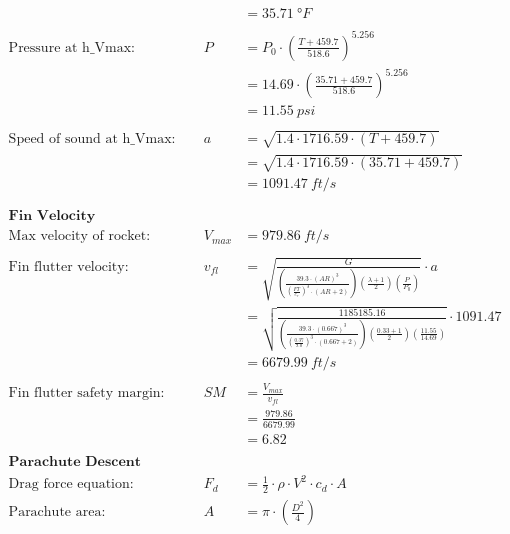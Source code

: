 \documentclass{article}
\begin{document}
\begin{align*}
		&& &= \SI{35.71}{\degree F} \\ \\
		\text{Pressure at h\_Vmax:}& &P &= P_{0} \cdot \left(\frac{T + 459.7}{ 518.6 }\right)^{5.256} \tag{eqn.6} \\
		&& &= 14.69\cdot \left(\frac{35.71 + 459.7 }{ 518.6 }\right)^{5.256} \\
		&& &= \SI{11.55}{psi} \\ \\
		\text{Speed of sound at h\_Vmax: }& &a &= \sqrt { 1.4 \cdot 1716.59 \cdot \left(T + 459.7 \right) } \tag{eqn. 7}\\&& &= \sqrt { 1.4 \cdot 1716.59 \cdot \left(35.71 + 459.7 \right) } \\
		&& &= \SI{1091.47}{ft/s} \\ \\
		\\
		\textbf{Fin Velocity Calculations} \\
		\text{Max velocity of rocket:}& &V_{max} &= \SI{979.86}{ft/s} \\ \\
		\text{Fin flutter velocity:}& &v_{fl} &= \sqrt {\frac{ G }{\left( \frac{ 39.3 \cdot \left( AR \right) ^{ 3 } }{ \left( \frac{ FT }{ c_{r} } \right) ^{ 3 } \cdot \left( AR + 2 \right) } \right) \left( \frac{ \lambda + 1 }{ 2 } \right) \left( \frac{ P }{ P_{0} } \right) } } \cdot a \tag{eqn. 8} \\&& &= \sqrt { \frac{1185185.16}{ \left( \frac{ 39.3 \cdot \left(0.667 \right) ^{ 3 } }{ \left( \frac{0.37}{9.0} \right) ^{3} \cdot \left(0.667 + 2 \right) } \right) \left( \frac{0.33+ 1 }{ 2 } \right) \left( \frac{11.55}{14.69} \right) } } \cdot 1091.47\\&& &= \SI{6679.99}{ft/s} \\ \\
		\text{Fin flutter safety margin:}& &SM &= \frac{V_{max}}{v_{fl}} \tag{eqn. 9} \\&& &= \frac{979.86}{6679.99} \\
		&& &= 6.82\\
		\\
		\textbf{Parachute Descent Velocity Equation Proof} \\
		\text{Drag force equation:}& &F_{d} &= \frac{1}{2} \cdot \rho \cdot V^{2} \cdot c_{d} \cdot A \tag{eqn. 10} \\
		\text{Parachute area:}& &A &= \pi \cdot \left( \frac{D^{2}}{4} \right) \\

\end{align*}
\end{document}
